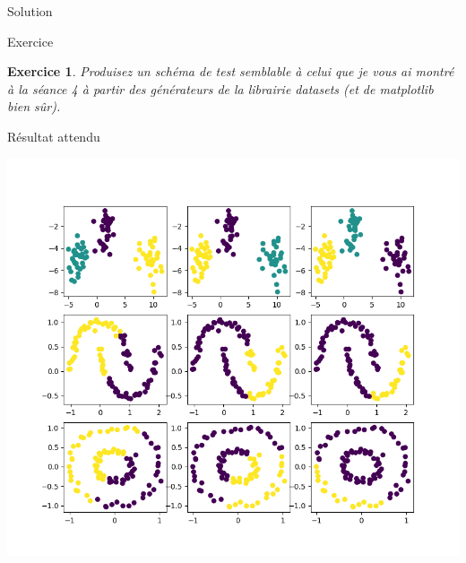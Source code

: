 \documentclass[11pt]{beamer}
\newtheorem{exercice}{Exercice}
\newcommand{\Pythonsmall}[1]{
	{\scriptsize }
}
\begin{document}
\begin{frame}{Solution}
\Pythonsmall{ex603}
\end{frame}



\begin{frame}{Exercice}

\begin{exercice}
Produisez un schéma de test semblable à celui que je vous ai montré à la séance 4 à partir des générateurs de la librairie datasets (et de matplotlib bien sûr). 
\end{exercice}
\end{frame}

\begin{frame}{Résultat attendu}
\begin{center}
\includegraphics[scale=0.4]{ex700}
\end{center}
\end{frame}
\end{document}
